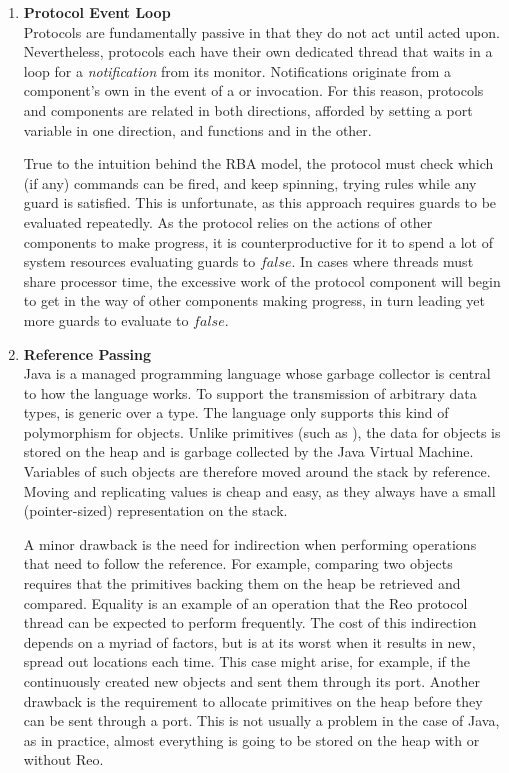\begin{enumerate}
	\item \textbf{Protocol Event Loop}\\
	Protocols are fundamentally passive in that they do not act until acted upon. Nevertheless, protocols each have their own dedicated thread that waits in a loop for a \textit{notification} from its monitor. Notifications originate from a component's own  in the event of a  or  invocation. For this reason, protocols and components are related in both directions, afforded by setting a port variable in one direction, and functions  and  in the other.
	
	True to the intuition behind the RBA model, the protocol must check which (if any) commands can be fired, and keep spinning, trying rules while any guard is satisfied. This is unfortunate, as this approach requires guards to be evaluated repeatedly. As the protocol relies on the actions of other components to make progress, it is counterproductive for it to spend a lot of system resources evaluating guards to $false$. In cases where threads must share processor time, the excessive work of the protocol component will begin to get in the way of other components making progress, in turn leading yet more guards to evaluate to $false$.
	
	\item \textbf{Reference Passing}\\
	Java is a managed programming language whose garbage collector is central to how the language works. To support the transmission of arbitrary data types,  is generic over a type. The language only supports this kind of polymorphism for objects. Unlike primitives (such as ), the data for objects is stored on the heap and is garbage collected by the Java Virtual Machine. Variables of such objects are therefore moved around the stack by reference. Moving and replicating values is cheap and easy, as they always have a small (pointer-sized) representation on the stack.
	
	A minor drawback is the need for indirection when performing operations that need to follow the reference. For example, comparing two  objects requires that the  primitives backing them on the heap be retrieved and compared. Equality is an example of an operation that the Reo protocol thread can be expected to perform frequently. The cost of this indirection depends on a myriad of factors, but is at its worst when it results in new, spread out locations each time. This case might arise, for example, if the  continuously created new  objects and sent them through its port. Another drawback is the requirement to allocate primitives on the heap before they can be sent through a port. This is not usually a problem in the case of Java, as in practice, almost everything is going to be stored on the heap with or without Reo.
	

\end{enumerate}
